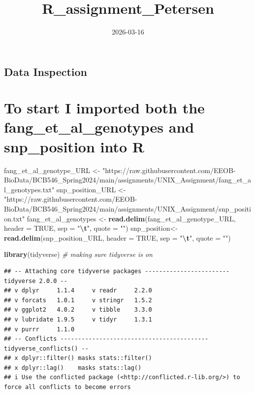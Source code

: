 \documentclass[
]{article}
\title{R\_assignment\_Petersen}
\author{}
\date{\vspace{-2.5em}2026-03-16}
\newenvironment{Shaded}{\begin{snugshade}}{\end{snugshade}}
\newcommand{\AttributeTok}[1]{\textcolor[rgb]{0.13,0.29,0.53}{#1}}
\newcommand{\CommentTok}[1]{\textcolor[rgb]{0.56,0.35,0.01}{\textit{#1}}}
\newcommand{\ConstantTok}[1]{\textcolor[rgb]{0.56,0.35,0.01}{#1}}
\newcommand{\FunctionTok}[1]{\textcolor[rgb]{0.13,0.29,0.53}{\textbf{#1}}}
\newcommand{\NormalTok}[1]{#1}
\newcommand{\OtherTok}[1]{\textcolor[rgb]{0.56,0.35,0.01}{#1}}
\newcommand{\SpecialCharTok}[1]{\textcolor[rgb]{0.81,0.36,0.00}{\textbf{#1}}}
\newcommand{\StringTok}[1]{\textcolor[rgb]{0.31,0.60,0.02}{#1}}
\begin{document}
\maketitle

\subsection{Data Inspection}\label{data-inspection}

\section{To start I imported both the fang\_et\_al\_genotypes and
snp\_position into
R}\label{to-start-i-imported-both-the-fang_et_al_genotypes-and-snp_position-into-r}

\begin{Shaded}
\begin{Highlighting}[]
\NormalTok{fang\_et\_al\_genotype\_URL }\OtherTok{\textless{}{-}} \StringTok{"https://raw.githubusercontent.com/EEOB{-}BioData/BCB546\_Spring2024/main/assignments/UNIX\_Assignment/fang\_et\_al\_genotypes.txt"}
\NormalTok{snp\_position\_URL }\OtherTok{\textless{}{-}}\StringTok{"https://raw.githubusercontent.com/EEOB{-}BioData/BCB546\_Spring2024/main/assignments/UNIX\_Assignment/snp\_position.txt"}
\NormalTok{fang\_et\_al\_genotypes }\OtherTok{\textless{}{-}} \FunctionTok{read.delim}\NormalTok{(fang\_et\_al\_genotype\_URL, }\AttributeTok{header =} \ConstantTok{TRUE}\NormalTok{, }\AttributeTok{sep =} \StringTok{"}\SpecialCharTok{\textbackslash{}t}\StringTok{"}\NormalTok{, }\AttributeTok{quote =} \StringTok{""}\NormalTok{)}
\NormalTok{snp\_position}\OtherTok{\textless{}{-}} \FunctionTok{read.delim}\NormalTok{(snp\_position\_URL, }\AttributeTok{header =} \ConstantTok{TRUE}\NormalTok{, }\AttributeTok{sep =} \StringTok{"}\SpecialCharTok{\textbackslash{}t}\StringTok{"}\NormalTok{, }\AttributeTok{quote =} \StringTok{""}\NormalTok{)}
\end{Highlighting}
\end{Shaded}

\begin{Shaded}
\begin{Highlighting}[]
\FunctionTok{library}\NormalTok{(tidyverse) }\CommentTok{\# making sure tidyverse is on}
\end{Highlighting}
\end{Shaded}

\begin{verbatim}
## -- Attaching core tidyverse packages ------------------------ tidyverse 2.0.0 --
## v dplyr     1.1.4     v readr     2.2.0
## v forcats   1.0.1     v stringr   1.5.2
## v ggplot2   4.0.2     v tibble    3.3.0
## v lubridate 1.9.5     v tidyr     1.3.1
## v purrr     1.1.0     
## -- Conflicts ------------------------------------------ tidyverse_conflicts() --
## x dplyr::filter() masks stats::filter()
## x dplyr::lag()    masks stats::lag()
## i Use the conflicted package (<http://conflicted.r-lib.org/>) to force all conflicts to become errors
\end{verbatim}
\end{document}
